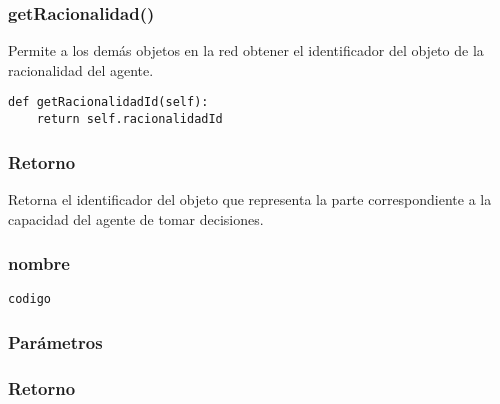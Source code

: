 \documentclass{article}
\begin{document}
\subsubsection{\textbf{getRacionalidad}()}
Permite a los demás objetos en la red obtener el identificador del objeto de la racionalidad del agente.
\begin{lstlisting}
def getRacionalidadId(self):
	return self.racionalidadId
\end{lstlisting}
\subsubsection*{Retorno}
Retorna el identificador del objeto que representa la parte correspondiente a la capacidad del agente de tomar decisiones.
\subsubsection{nombre}
\begin{lstlisting}
codigo
\end{lstlisting}
\subsubsection*{Parámetros}
\subsubsection*{Retorno}
\end{document}
